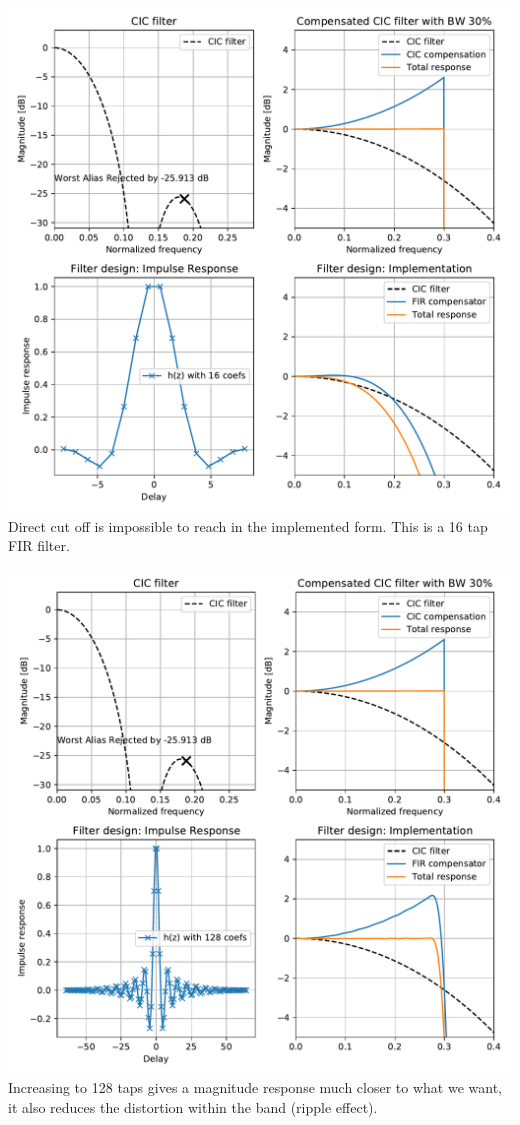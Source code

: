 \documentclass{article}
\begin{document}
\begin{center}
	\begin{minipage}{0.40\linewidth}
		\includegraphics[width=0.99\linewidth]{fir-des-3.pdf}
		Direct cut off is impossible to reach in the implemented
		form. This is a 16 tap FIR filter.
	\end{minipage}
	\begin{minipage}{0.40\linewidth}
		\includegraphics[width=0.99\linewidth]{fir-des-4.pdf}
		Increasing to 128 taps gives a magnitude response much
		closer to what we want, it also reduces
		the distortion within the band (ripple effect).
	\end{minipage}
\end{center}
\end{document}
